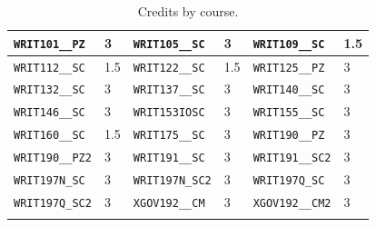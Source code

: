 \begin{longtable}{|l|l||l|l||l|l|}
    \verb|WRIT101__PZ| & 3 & \verb|WRIT105__SC| & 3 & \verb|WRIT109__SC| & 1.5\\\hline
    \verb|WRIT112__SC| & 1.5 & \verb|WRIT122__SC| & 1.5 & \verb|WRIT125__PZ| & 3\\\hline
    \verb|WRIT132__SC| & 3 & \verb|WRIT137__SC| & 3 & \verb|WRIT140__SC| & 3\\\hline
    \verb|WRIT146__SC| & 3 & \verb|WRIT153IOSC| & 3 & \verb|WRIT155__SC| & 3\\\hline
    \verb|WRIT160__SC| & 1.5 & \verb|WRIT175__SC| & 3 & \verb|WRIT190__PZ| & 3\\\hline
    \verb|WRIT190__PZ2| & 3 & \verb|WRIT191__SC| & 3 & \verb|WRIT191__SC2| & 3\\\hline
    \verb|WRIT197N_SC| & 3 & \verb|WRIT197N_SC2| & 3 & \verb|WRIT197Q_SC| & 3\\\hline
    \verb|WRIT197Q_SC2| & 3 & \verb|XGOV192__CM| & 3 & \verb|XGOV192__CM2| & 3\\\hline
    \caption{Credits by course.}
    \label{tab:credits}
\end{longtable}
